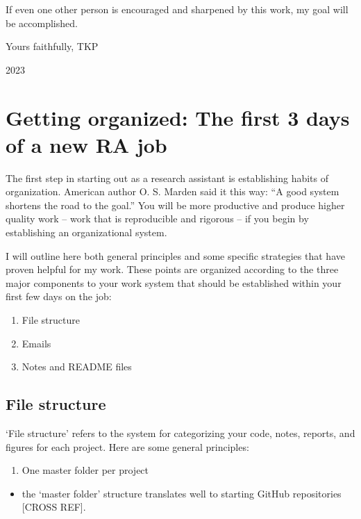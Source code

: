 \documentclass[
]{book}
\providecommand{\tightlist}{%
  \setlength{\itemsep}{0pt}\setlength{\parskip}{0pt}}
\begin{document}
If even one other person is encouraged and sharpened by this work, my goal will be accomplished.

Yours faithfully,
TKP

2023

\hypertarget{getting-organized-the-first-3-days-of-a-new-ra-job}{%
\chapter{Getting organized: The first 3 days of a new RA job}\label{getting-organized-the-first-3-days-of-a-new-ra-job}}

The first step in starting out as a research assistant is establishing habits of organization. American author O. S. Marden said it this way: ``A good system shortens the road to the goal.'' You will be more productive and produce higher quality work -- work that is reproducible and rigorous -- if you begin by establishing an organizational system.

I will outline here both general principles and some specific strategies that have proven helpful for my work. These points are organized according to the three major components to your work system that should be established within your first few days on the job:

\begin{enumerate}
\def\labelenumi{\arabic{enumi}.}
\item
  File structure
\item
  Emails
\item
  Notes and README files
\end{enumerate}

\hypertarget{file-structure}{%
\section{File structure}\label{file-structure}}

`File structure' refers to the system for categorizing your code, notes, reports, and figures for each project. Here are some general principles:

\begin{enumerate}
\def\labelenumi{\arabic{enumi}.}
\tightlist
\item
  One master folder per project
\end{enumerate}

\begin{itemize}
\tightlist
\item
  the `master folder' structure translates well to starting GitHub repositories {[}CROSS REF{]}.
\end{itemize}
\end{document}
